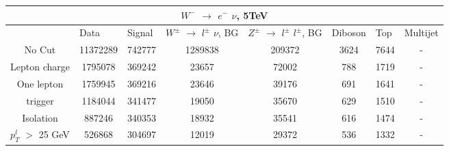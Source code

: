 \documentclass[10pt]{article}
\begin{document}
 										
\begin{center}										
\begin{table}[H] 										
\begin{adjustbox}{width=1\textwidth}								
\begin{tabular}{cccccccc} 									
\\ \hline \hline  										
\multicolumn{8}{c}{$W^{-}$ $\rightarrow$ $e^{-}$ $\nu$, 5TeV}  									
\\ \hline \hline                            						
\multicolumn{1}{|c|}{}   & \multicolumn{1}{l|}{Data} & \multicolumn{1}{l|}{Signal} & \multicolumn{1}{l|}{$W^{\pm}$ $\rightarrow$ $l^{\pm}$ $\nu$, BG} & \multicolumn{1}{l|}{$Z^{\pm}$ $\rightarrow$ $l^{\pm}$ $l^{\pm}$, BG} & \multicolumn{1}{l|}{Diboson} & \multicolumn{1}{l|}{Top} & \multicolumn{1}{l|}{Multijet} \\ \hline 
\multicolumn{1}{|c|}{No Cut}  & \multicolumn{1}{c|}{11372289} & \multicolumn{1}{c|}{742777} & \multicolumn{1}{c|}{1289838} & \multicolumn{1}{c|}{209372} & \multicolumn{1}{c|}{3624} & \multicolumn{1}{c|}{7644} & \multicolumn{1}{c|}{-}  \\ \hline 
\multicolumn{1}{|c|}{Lepton charge}  & \multicolumn{1}{c|}{1795078} & \multicolumn{1}{c|}{369242} & \multicolumn{1}{c|}{23657} & \multicolumn{1}{c|}{72002} & \multicolumn{1}{c|}{788} & \multicolumn{1}{c|}{1719} & \multicolumn{1}{c|}{-}  \\ \hline 
\multicolumn{1}{|c|}{One lepton}  & \multicolumn{1}{c|}{1759945} & \multicolumn{1}{c|}{369216} & \multicolumn{1}{c|}{23646} & \multicolumn{1}{c|}{39176} & \multicolumn{1}{c|}{691} & \multicolumn{1}{c|}{1641} & \multicolumn{1}{c|}{-}  \\ \hline 
\multicolumn{1}{|c|}{trigger}  & \multicolumn{1}{c|}{1184044} & \multicolumn{1}{c|}{341477} & \multicolumn{1}{c|}{19050} & \multicolumn{1}{c|}{35670} & \multicolumn{1}{c|}{629} & \multicolumn{1}{c|}{1510} & \multicolumn{1}{c|}{-}  \\ \hline 
\multicolumn{1}{|c|}{Isolation}  & \multicolumn{1}{c|}{887246} & \multicolumn{1}{c|}{340353} & \multicolumn{1}{c|}{18932} & \multicolumn{1}{c|}{35541} & \multicolumn{1}{c|}{616} & \multicolumn{1}{c|}{1474} & \multicolumn{1}{c|}{-}  \\ \hline 
\multicolumn{1}{|c|}{$p_{T}^{l}$ $>$ 25 GeV}  & \multicolumn{1}{c|}{526868} & \multicolumn{1}{c|}{304697} & \multicolumn{1}{c|}{12019} & \multicolumn{1}{c|}{29372} & \multicolumn{1}{c|}{536} & \multicolumn{1}{c|}{1332} & \multicolumn{1}{c|}{-}  \\ \hline 

\end{tabular}
\end{adjustbox}
\end{table}
\end{center}
\end{document}
